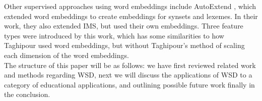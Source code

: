 Other supervised approaches using word embeddings include AutoExtend \cite{rothe2015autoextend}, which extended word embeddings to create embeddings for synsets and lexemes. In their work, they also extended IMS, but used their own embeddings. Three feature types were introduced by this work, which has some similarities to how Taghipour used word embeddings, but without Taghipour's method of scaling each dimension of the word embeddings. \\



The structure of this paper will be as follows: we have first reviewed related work and methods regarding WSD, next we will discuss the applications of WSD to a category of educational applications, and outlining possible future work finally in the conclusion. 
